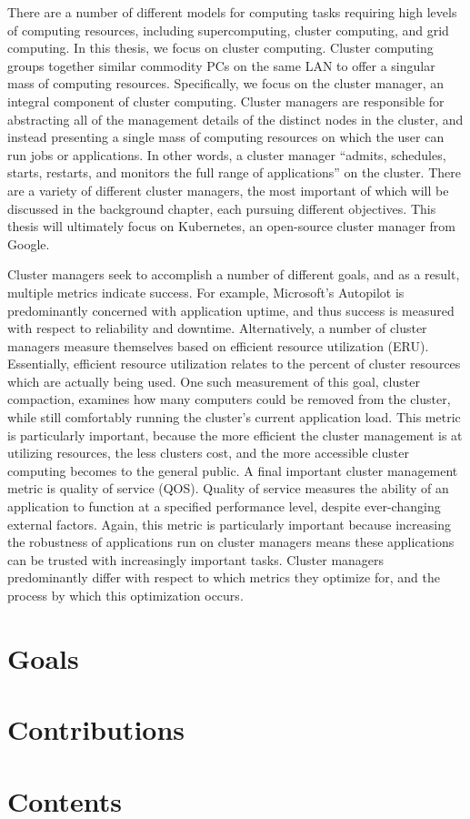 There are a number of different models for computing tasks requiring high levels
of computing resources, including supercomputing, cluster computing, and grid
computing. In this thesis, we focus on cluster computing. Cluster computing
groups together similar commodity PCs on the same LAN to offer a singular mass
of computing resources. Specifically, we focus on the
cluster manager, an integral component of cluster computing. Cluster managers
are responsible for abstracting all of the management details of the distinct
nodes in the cluster, and instead presenting a single mass of computing resources
on which the user can run jobs or applications. In other words,
a cluster manager ``admits, schedules, starts, restarts, and monitors the full
range of applications'' on the cluster.\cite[pg. 1]{borg} There are a
variety of different cluster managers, the most important of which will be
discussed in the background chapter, each pursuing different objectives. This
thesis will ultimately focus on Kubernetes, an open-source cluster
manager from Google.\cite{k8s-website}

Cluster managers seek to accomplish a number of different goals, and as a
result, multiple metrics indicate success. For example, Microsoft's Autopilot is
predominantly concerned with application uptime, and thus success is measured
with respect to reliability and downtime.\cite[pg. 1]{autopilot}
Alternatively, a number of cluster managers measure themselves based on
efficient resource utilization (ERU).\cite[pg. 7]{borg} Essentially, efficient
resource utilization relates to the percent of cluster resources which are
actually being used. One such measurement of this goal, cluster
compaction, examines how many computers could be removed from the cluster, while
still comfortably running the cluster's current application load.\cite[pg.
5]{evaluating-job-packing-in-warehouse-scale-computing} This metric is
particularly important, because the more efficient the cluster management is at
utilizing resources, the less clusters cost, and the more accessible cluster
computing becomes to the general public. A final important
cluster management metric is quality of service (QOS). Quality of service measures the
ability of an application to function at a specified
performance level, despite ever-changing
external factors. Again, this metric is particularly important because
increasing the robustness of applications run on cluster managers means
these applications can be trusted with increasingly important tasks. Cluster
managers predominantly differ with respect to which metrics they optimize
for, and the process by which this optimization occurs.

\section{Goals}



\section{Contributions}



\section{Contents}



